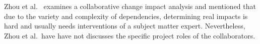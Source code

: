 \documentclass[conference]{IEEEtran}
\begin{document}
Zhou et al.~\cite{zhou2014collaborative} examines a collaborative
change impact analysis and mentioned that due to the variety and
complexity of dependencies, determining real impacts is hard and
usually needs interventions of a subject matter expert. Nevertheless,
Zhou et al.~have have not discusses the specific project roles of the
collaborators.

\end{document}
